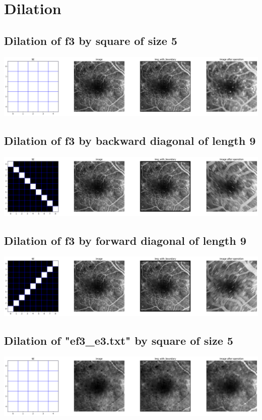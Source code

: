 \documentclass{article}
\begin{document}
\section{Dilation}
\subsection{Dilation of f3 by square of size 5}
\includegraphics[width=\linewidth]{images/df3_d3.png}
\\ 

\subsection{Dilation of f3 by backward diagonal of length 9}
\includegraphics[width=\linewidth]{images/df3_d4.png}
\\ 

\subsection{Dilation of f3 by forward diagonal of length 9}
\includegraphics[width=\linewidth]{images/df3_d5.png}
\\ 

\subsection{Dilation of "ef3\_e3.txt" by square of size 5}
\includegraphics[width=\linewidth]{images/of3_o3.png}
\\ 
\end{document}
